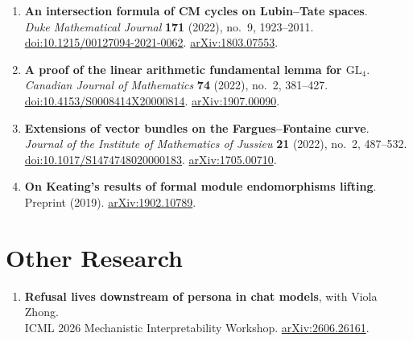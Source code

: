 \documentclass[a4paper,11pt]{article}
\begin{document}
\begin{enumerate}[leftmargin=1.6em, itemsep=.55em, topsep=.4em, parsep=0pt]
  \item \textbf{An intersection formula of CM cycles on Lubin--Tate spaces}.\\
        \emph{Duke Mathematical Journal} \textbf{171} (2022), no.~9, 1923--2011.
        \href{https://doi.org/10.1215/00127094-2021-0062}{doi:10.1215/00127094-2021-0062}.
        \href{https://arxiv.org/abs/1803.07553}{arXiv:1803.07553}.

  \item \textbf{A proof of the linear arithmetic fundamental lemma for $\mathrm{GL}_4$}.\\
        \emph{Canadian Journal of Mathematics} \textbf{74} (2022), no.~2, 381--427.
        \href{https://doi.org/10.4153/S0008414X20000814}{doi:10.4153/S0008414X20000814}.
        \href{https://arxiv.org/abs/1907.00090}{arXiv:1907.00090}.

  \item \textbf{Extensions of vector bundles on the Fargues--Fontaine curve}.\\
        \emph{Journal of the Institute of Mathematics of Jussieu} \textbf{21} (2022), no.~2, 487--532.
        \href{https://doi.org/10.1017/S1474748020000183}{doi:10.1017/S1474748020000183}.
        \href{https://arxiv.org/abs/1705.00710}{arXiv:1705.00710}.

  \item \textbf{On Keating's results of formal module endomorphisms lifting}.\\
        Preprint (2019). \href{https://arxiv.org/abs/1902.10789}{arXiv:1902.10789}.

\end{enumerate}

\section{Other Research}

\begin{enumerate}[leftmargin=1.6em, itemsep=.55em, topsep=.4em, parsep=0pt]
  \item \textbf{Refusal lives downstream of persona in chat models},
        with Viola Zhong.\\
        ICML 2026 Mechanistic Interpretability Workshop.
        \href{https://arxiv.org/abs/2606.26161}{arXiv:2606.26161}.
\end{enumerate}

\end{document}

